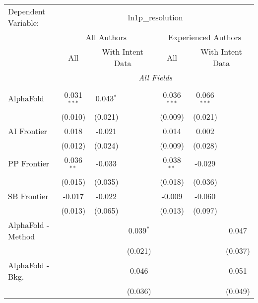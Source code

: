 \begingroup
\centering
\begin{tabular}{lcccccc}
   \tabularnewline \midrule \midrule
   Dependent Variable: & \multicolumn{6}{c}{ln1p\_resolution}\\
 & \multicolumn{3}{c}{All Authors} & \multicolumn{3}{c}{Experienced Authors} \\
\cmidrule(lr){2-4} \cmidrule(lr){5-7}
 & \multicolumn{1}{c}{All} & \multicolumn{2}{c}{With Intent Data} & \multicolumn{1}{c}{All} & \multicolumn{2}{c}{With Intent Data} \\
\cmidrule(lr){2-2} \cmidrule(lr){3-4} \cmidrule(lr){5-5} \cmidrule(lr){6-7}
 & \multicolumn{6}{c}{\textit{All Fields}} \\ \\
   AlphaFold                     & 0.031$^{***}$ & 0.043$^{*}$ &                & 0.036$^{***}$ & 0.066$^{***}$ &   \\   
                                 & (0.010)       & (0.021)     &                & (0.009)       & (0.021)       &   \\   
   AI Frontier                   & 0.018         & -0.021      &                & 0.014         & 0.002         &   \\   
                                 & (0.012)       & (0.024)     &                & (0.009)       & (0.028)       &   \\   
   PP Frontier                   & 0.036$^{**}$  & -0.033      &                & 0.038$^{**}$  & -0.029        &   \\   
                                 & (0.015)       & (0.035)     &                & (0.018)       & (0.036)       &   \\   
   SB Frontier                   & -0.017        & -0.022      &                & -0.009        & -0.060        &   \\   
                                 & (0.013)       & (0.065)     &                & (0.013)       & (0.097)       &   \\   
   AlphaFold - Method            &               &             & 0.039$^{*}$    &               &               & 0.047\\   
                                 &               &             & (0.021)        &               &               & (0.037)\\   
   AlphaFold - Bkg.              &               &             & 0.046          &               &               & 0.051\\   
                                 &               &             & (0.036)        &               &               & (0.049)\\   

\end{tabular}
